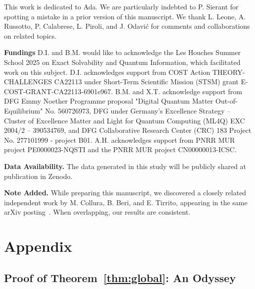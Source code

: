 \documentclass[prx,twocolumn,superscriptaddress,aps,10pt, frontmatterverbose, reprint,footinbib,longbibliography=true]{revtex4-2}
\begin{document}
\begin{acknowledgments}
This work is dedicated to Ada. We are particularly indebted to P. Sierant for spotting a mistake in a prior version of this manuscript. 
We thank L. Leone, A. Russotto, P. Calabrese, L. Piroli, and J. Odavić for comments and collaborations on related topics.

\textbf{Fundings}
D.I. and B.M. would like to acknowledge the Les Houches Summer School 2025 on Exact Solvability and Quantum Information, which facilitated work on this subject.
D.I. acknowledges support from COST Action THEORY-CHALLENGES CA22113 under Short-Term Scientific Mission (STSM) grant E-COST-GRANT-CA22113-6901e967.  
B.M. and X.T. acknowledge support from DFG Emmy Noether Programme proposal "Digital Quantum Matter Out-of-Equilibrium" No. 560726973, DFG under Germany's Excellence Strategy – Cluster of Excellence Matter and Light for Quantum Computing (ML4Q) EXC 2004/2 – 390534769, and DFG Collaborative Research Center (CRC) 183 Project No. 277101999 - project B01. 
A.H. acknowledges support from  PNRR MUR project PE0000023-NQSTI and the PNRR MUR project CN00000013-ICSC.

\textbf{Data Availability.} The data generated in this study will be publicly shared at publication in Zenodo.



\textbf{Note Added.}
While preparing this manuscript, we discovered a closely related independent work by M. Collura, B. Beri, and E. Tirrito, appearing in the same arXiv posting~\cite{collura2026nonlocalnonstabilizernessfreefermion}. 
When overlapping, our results are consistent.
\end{acknowledgments}
\clearpage

\section{Appendix}
\label{sec:Appendix}

\subsection{Proof of Theorem~\ref{thm:global}: An Odyssey %
}
\label{app:proof}
\end{document}
